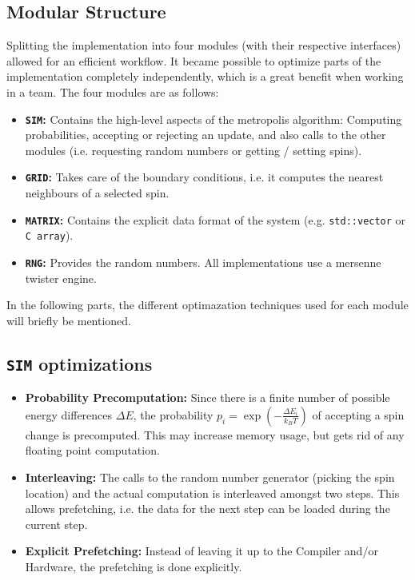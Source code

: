 \documentclass[letterpaper]{article}
\begin{document}
\subsection{Modular Structure} Splitting the implementation into four modules (with their respective interfaces) allowed for an efficient workflow. It became possible to optimize parts of the implementation completely independently, which is a great benefit when working in a team. The four modules are as follows:
\begin{itemize}[noitemsep, topsep = 0pt]
\item \textbf{\texttt{SIM}:} Contains the high-level aspects of the metropolis algorithm: Computing probabilities, accepting or rejecting an update, and also calls to the other modules (i.e. requesting random numbers or getting / setting spins).
\item \textbf{\texttt{GRID}:} Takes care of the boundary conditions, i.e. it computes the nearest neighbours of a selected spin.
\item \textbf{\texttt{MATRIX}:} Contains the explicit data format  of the system (e.g. \texttt{std::vector} or \texttt{C array}).
\item \textbf{\texttt{RNG}:} Provides the random numbers. All implementations use a mersenne twister engine.
\end{itemize}
In the following parts, the different optimazation techniques used for each module will briefly be mentioned.
\subsection{\texttt{SIM} optimizations}\label{opt:sim}
\begin{itemize}[noitemsep, topsep = 0pt]
\item \textbf{Probability Precomputation:} Since there is a finite number of possible energy differences $\Delta E$, the probability $p_i = \exp{\left(-\frac{\Delta E_i}{k_B T}\right)}$ of accepting a spin change is precomputed. This may increase memory usage, but gets rid of any floating point computation.
\item \textbf{Interleaving:} The calls to the random number generator (picking the spin location) and the actual computation is interleaved amongst two steps. This allows prefetching, i.e. the data for the next step can be loaded during the current step.
\item \textbf{Explicit Prefetching:} Instead of leaving it up to the Compiler and/or Hardware, the prefetching is done explicitly. 
\end{itemize}
\end{document}
